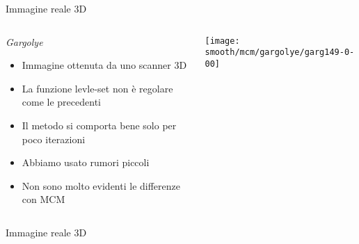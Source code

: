 \begin{frame}{Immagine reale 3D}
 \begin{columns}[T]
    \begin{column}{4cm}
      \begin{block}{\emph{Gargolye}}
        \begin{itemize}
        \item Immagine ottenuta da uno scanner 3D
        \item La funzione levle-set non è regolare come le precedenti 
        \item Il metodo si comporta bene solo per poco iterazioni
        \item Abbiamo usato rumori piccoli
        \item Non sono molto evidenti le differenze con MCM
        \end{itemize}
      \end{block}
    \end{column}
   \begin{column}{6cm}
     \texttt{[image: smooth/mcm/gargolye/garg149-0-00]}
   \end{column}
  \end{columns}
\end{frame}

\begin{frame}{Immagine reale 3D}
  \begin{columns}[T]
  \begin{column}{5cm}
    \centering
    \end{column}
  \begin{column}[T]{5cm}
    \centering
    \end{column}
 \end{columns}
\end{frame}
